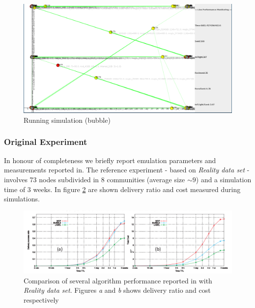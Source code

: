 \begin{figure}[h!]
	\begin{center}
    \includegraphics[scale=0.25]{img/bubble_live.png}
    \caption{Running simulation (bubble)}
    \label{fig:bubble_live}
  \end{center}
\end{figure}

\newpage
\subsubsection{Original Experiment}
In honour of completeness we briefly report emulation parameters and measurements reported in\cite{bubble}. The reference experiment - based on \emph{Reality data set} - involves 73 nodes subdivided in 8 communities (average size $\sim 9$) and a simulation time of 3 weeks. In figure \ref{fig:reality_emulation} are shown delivery ratio and cost measured during simulations.
\begin{center}
\begin{figure}[h!]
    		\includegraphics[scale=0.35]{img/reality_emulation.png}
    		\caption{Comparison of several algorithm performance reported in \cite{bubble} with \emph{Reality data set}. Figures \emph{a} and \emph{b} shows delivery ratio and cost respectively}
    		\label{fig:reality_emulation}
\end{figure}
\end{center}

